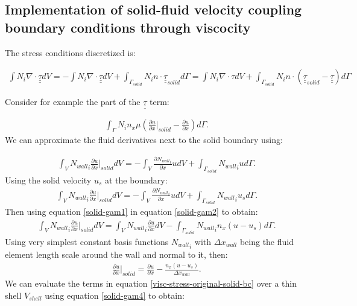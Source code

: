 \subsection{Implementation of solid-fluid velocity coupling boundary conditions through viscocity}


The stress conditions discretized is: 

\begin{eqnarray}
\int N_i \nabla \cdot \underline{\underline{\tau}} dV = 
-
\int N_i \nabla \cdot \underline{\underline{\tau}} dV 
+ \int_{\Gamma_{solid}} N_i n\cdot \underline{\underline{\tau}}_{solid} d\Gamma
=\int N_i \nabla \cdot \tau dV
+ \int_{\Gamma_{solid}} N_i n\cdot (\underline{\underline{\tau}}_{solid} - \underline{\underline{\tau}}) d\Gamma
\label{visc-stress-original} 
\end{eqnarray} 

Consider for example the part of the $\underline{\underline{\tau}}$ term: 

\begin{eqnarray}
\int_\Gamma N_i n_x \mu ( \frac{\partial u}{\partial x}\vert_{solid} - \frac{\partial u}{\partial x} ) d\Gamma. 
\label{visc-stress-original-solid-bc} 
\end{eqnarray} 
We can approximate the fluid derivatives next to the solid boundary using: 

\begin{eqnarray}
\int_V {N_{wall}}_i \frac{\partial u}{\partial x} \vert_{solid} dV 
= 
- \int_V \frac{\partial {N_{wall}}_i }{\partial x} u dV 
+\int_{\Gamma_{solid}} {N_{wall}}_i  u d\Gamma.
\label{solid-gam1} 
\end{eqnarray} 
Using the solid velocity $u_s$ at the boundary: 
\begin{eqnarray}
\int_V {N_{wall}}_i \frac{\partial u}{\partial x} \vert_{solid} dV 
= 
- \int_V \frac{\partial {N_{wall}}_i }{\partial x} u dV 
+\int_{\Gamma_{solid}} {N_{wall}}_i  u_s d\Gamma.
\label{solid-gam2} 
\end{eqnarray} 
Then using equation \ref{solid-gam1} in equation \ref{solid-gam2} to obtain: 
\begin{eqnarray}
\int_V {N_{wall}}_i \frac{\partial u}{\partial x} \vert_{solid} dV 
= \int_V {N_{wall}}_i \frac{\partial u}{\partial x} dV 
-\int_{\Gamma_{solid}} {N_{wall}}_i  n_x (u-u_s) d\Gamma.
\label{solid-gam3} 
\end{eqnarray} 
Using very simplest constant basis functions ${N_{wall}}_i$ with $\Delta x_{wall}$ being the 
fluid element length scale around the wall and normal to it, then: 
\begin{eqnarray}
 \frac{\partial u}{\partial x} \vert_{solid} 
= \frac{\partial u}{\partial x} 
-\frac{ n_x (u-u_s) }{\Delta x_{wall}}.
\label{solid-gam4} 
\end{eqnarray} 
We can evaluate the terms in equation \ref{visc-stress-original-solid-bc} over a thin shell $V_{shell}$ using equation \ref{solid-gam4} to obtain: 

